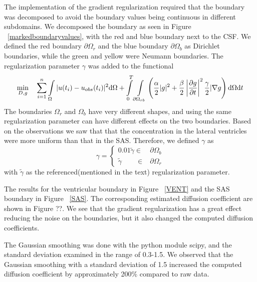 \documentclass[12pt,a4paper]{article}
\begin{document}
The implementation of the gradient regularization required that the boundary was decomposed to avoid the boundary values being continuous in different subdomains. We decomposed the boundary as seen in Figure ~\ref{markedboundaryvalues}, with the red and blue boundary next to the CSF. We defined the red boundary $\partial \Omega_r$ and the blue boundary $\partial \Omega_b$ as Dirichlet boundaries, while the green and yellow were Neumann boundaries. The regularization parameter $\gamma$ was added to the functional 
\begin{equation}
\min_{D,g} \quad \sum\limits_{i=1}\sp{n} \int\limits_{\Omega} |u(t_i) - u_{obs}(t_i)|\sp{2} \mathrm{d}\Omega + \int\limits_{0}\sp{T} \int\limits_{\partial \Omega_{rb}} \left( \frac{\alpha}{2} | g |\sp{2} + \frac{\beta}{2} \left| \frac{\partial g}{\partial t} \right|\sp{2}  \frac{\gamma}{2}| \nabla g  \right) \mathrm{d}\Omega \mathrm{d}t  
\end{equation}
The boundaries $\Omega_r$ and $\Omega_b$ have very different shapes, and using the same regularization parameter can have different effects on the two boundaries. Based on the  observations we saw that that the concentration in the lateral ventricles were more uniform than that in the SAS. Therefore, we defined $\gamma$ as
\begin{equation}
\gamma = \begin{cases}
0.01\tilde{\gamma}  \in &\partial \Omega_{b} \\ 
\tilde{\gamma} \qquad \in  &\partial \Omega_{r}
\end{cases}  
\end{equation} 
with $\tilde{\gamma}$ as the referenced(mentioned in the text) regularization parameter.



The results for the ventricular boundary in Figure ~\ref{VENT} and the SAS boundary in Figure ~\ref{SAS}. The corresponding estimated diffusion coefficient are shown in Figure ??. 
We see that the gradient regularization has a great effect reducing the noise on the boundaries, but it also changed the computed diffusion coefficients.


The Gaussian smoothing was done with the python module scipy, and the standard deviation examined in the range of 0.3-1.5. We observed that the Gaussian smoothing with a standard deviation of 1.5 increased the computed diffusion coefficient by approximately 200\% compared to raw data.   




\end{document}
